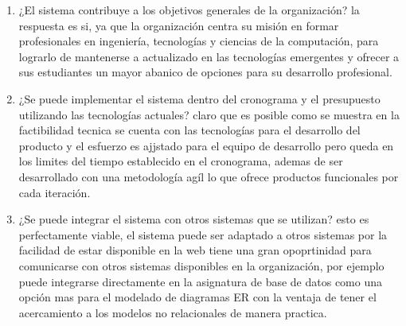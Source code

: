 \begin{enumerate}
    \item ¿El sistema contribuye a los objetivos generales de la organización? la respuesta es si, ya que la organización centra su misión en formar profesionales en ingeniería, tecnologías y ciencias de la computación, para lograrlo de mantenerse a actualizado en las tecnologías emergentes y ofrecer a sus estudiantes un mayor abanico de opciones para su desarrollo profesional.
    \item ¿Se puede implementar el sistema dentro del cronograma y el presupuesto utilizando las tecnologías actuales? claro que es posible como se muestra en la factibilidad tecnica se cuenta con las tecnologías para el desarrollo del producto y el esfuerzo es ajjstado para el equipo de desarrollo pero queda en los limites del tiempo establecido en el cronograma, ademas de ser desarrollado con una metodología agíl lo que ofrece productos funcionales por cada iteración.
    \item ¿Se puede integrar el sistema con otros sistemas que se utilizan? esto es perfectamente viable, el sistema puede ser adaptado a otros sistemas por la facilidad de estar disponible en la web tiene una gran opoprtinidad para comunicarse con otros sistemas disponibles en la organización, por ejemplo puede integrarse directamente en la asignatura de base de datos como una opción mas para el modelado de diagramas ER con la ventaja de tener el acercamiento a los modelos no relacionales de manera practica.
\end{enumerate}